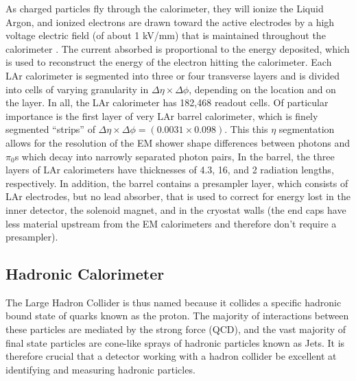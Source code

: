 As charged particles fly through the calorimeter, they will ionize the Liquid Argon, and ionized electrons are drawn toward the active electrodes by a high voltage electric field (of about 1 kV/mm) that is maintained throughout the calorimeter \cite{springerlink:10.1140/epjc/s10052-010-1354-y}. %
The current absorbed is proportional to the energy deposited, which is used to reconstruct the energy of the electron hitting the calorimeter.
Each LAr calorimeter is segmented into three or four transverse layers and is divided into cells of varying granularity in  $\Delta \eta \times \Delta \phi$, depending on the location and on the layer.%
In all, the LAr calorimeter has 182,468 readout cells.
Of particular importance is the first layer of very LAr barrel calorimeter, which is finely segmented ``strips'' of  $\Delta \eta \times \Delta \phi = (0.0031 \times 0.098)$. 
This this $\eta$ segmentation allows for the resolution of the EM shower shape differences between photons and $\pi_{0}$s which decay into narrowly separated photon pairs, 
In the barrel, the three layers of LAr calorimeters have thicknesses of 4.3, 16, and 2 radiation lengths, respectively.
In addition, the barrel contains a presampler layer, which consists of LAr electrodes, but no lead absorber, that is used to correct for energy lost in the inner detector, the solenoid magnet, and in the cryostat walls (the end caps have less material upstream from the EM calorimeters and therefore don't require a presampler). %



\subsection{Hadronic Calorimeter}
The Large Hadron Collider is thus named because it collides a specific hadronic bound state of quarks known as the proton.
The majority of interactions between these particles are mediated by the strong force (QCD), and the vast majority of final state particles are cone-like sprays of hadronic particles known as Jets.
It is therefore crucial that a detector working with a hadron collider be excellent at identifying and measuring hadronic particles.

